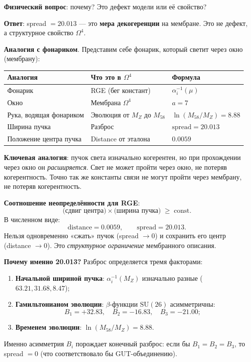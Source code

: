 \documentclass[11pt,a4paper]{article}
\newcommand{\SU}{\ensuremath{\mathrm{SU}}}
\newcommand{\Om}{\ensuremath{\Omega^4}}
\theoremstyle{definition}
\begin{document}
\medskip\noindent
\textbf{Физический вопрос}: почему? Это дефект модели 
или её свойство?

\medskip\noindent
\textbf{Ответ}: spread $= 20.013$ --- это
\textbf{мера декогеренции} на мембране. Это не дефект, 
а структурное свойство $\Om$.

\medskip\noindent
\textbf{Аналогия с фонариком}. Представим себе фонарик, 
который светит через окно (мембрану):

\begin{center}
\begin{tabular}{p{3.5cm}p{4.5cm}p{4cm}}
\toprule
Аналогия & Что это в $\Om$ & Формула \\
\midrule
Фонарик & RGE (бег констант) & $\alpha_i^{-1}(\mu)$ \\
Окно & Мембрана $\Om$ & $a = 7$ \\
Рука, водящая фонариком & Эволюция от $M_Z$ до $M_{58}$ 
    & $\ln(M_{58}/M_Z) = 8.88$ \\
Ширина пучка & Разброс & $\text{spread} = 20.013$ \\
Положение центра пучка & Distance от эталона & $0.0059$ \\
\bottomrule
\end{tabular}
\end{center}

\medskip\noindent
\textbf{Ключевая аналогия}: пучок света изначально 
когерентен, но при прохождении через окно он
\emph{расширяется}. Свет не может пройти через окно, 
не потеряв когерентность. Точно так же константы связи 
не могут пройти через мембрану, не потеряв когерентность.

\medskip\noindent
\textbf{Соотношение неопределённости для RGE}:
\begin{equation}
    \text{(сдвиг центра)} \times \text{(ширина пучка)}
    \;\geq\; \text{const}.
    \label{eq:uncertainty-rge}
\end{equation}
В численном виде:
\begin{equation}
    \text{distance} = 0.0059, \qquad
    \text{spread} = 20.013.
\end{equation}
Нельзя одновременно «сжать» пучок (spread $\to 0$) 
и сохранить его центр (distance $\to 0$). Это 
\emph{структурное ограничение} мембранного описания.

\medskip\noindent
\textbf{Почему именно 20.013?}
Разброс определяется тремя факторами:
\begin{enumerate}
    \item \textbf{Начальной шириной пучка}: 
          $\alpha_i^{-1}(M_Z)$ изначально разные 
          ($63.21, 31.68, 8.47$);
    \item \textbf{Гамильтонианом эволюции}: 
          $\beta$-функции $\SU(26)$ асимметричны:
          \begin{equation}
              B_1 = +32.83, \quad
              B_2 = -16.83, \quad
              B_3 = -21.00;
          \end{equation}
    \item \textbf{Временем эволюции}: 
          $\ln(M_{58}/M_Z) = 8.88$.
\end{enumerate}
Именно асимметрия $B_i$ порождает конечный разброс: 
если бы $B_1 = B_2 = B_3$, то spread $= 0$ (что 
соответствовало бы GUT-объединению).
\end{document}
